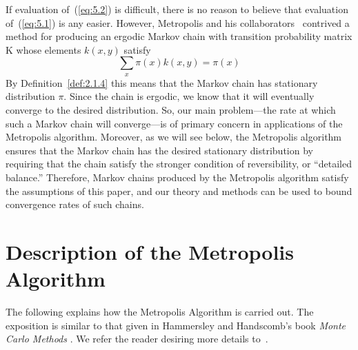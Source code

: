 If evaluation of~(\ref{eq:5.2}) is difficult, there is no reason to believe that
evaluation of~(\ref{eq:5.1}) is any easier. However, Metropolis and his
collaborators~\cite{Metropolis:1953} contrived a method for producing an ergodic 
%
%
%
%
Markov chain with transition probability matrix K whose elements $k(x,y)$ satisfy
\[
\sum_x \pi(x) k(x,y) = \pi(x)
\]
By 
Definition~\ref{def:2.1.4}
this means that the Markov chain has stationary distribution $\pi$. Since the
chain is ergodic, we know that it will eventually converge to the desired
distribution. So, our main 
problem---the rate at which such a Markov chain will converge---is of primary
concern in applications of the Metropolis algorithm. Moreover, as we will see
below, the Metropolis algorithm ensures that the Markov chain has the desired
stationary distribution by requiring that the chain satisfy the stronger
condition of reversibility, or ``detailed balance.'' Therefore, Markov chains
produced by the Metropolis algorithm satisfy the assumptions of this paper,
and our theory and methods can be used to bound convergence rates of such chains. 

\section{Description of the Metropolis Algorithm}
\label{sec:descr-metr-algor}
The following explains how the Metropolis Algorithm is carried out. The exposition is
similar to that given in Hammersley and Handscomb's book 
\emph{Monte Carlo Methods} \cite{Hammersley:1964}. We refer the reader desiring
more details to~\cite[Section 9.3]{Hammersley:1964}.

